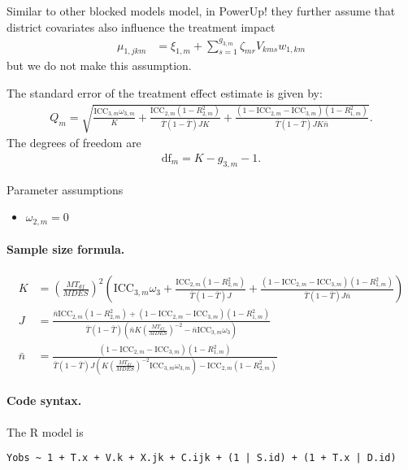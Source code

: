 \documentclass[12pt]{article}
\begin{document}
Similar to other blocked models model, in PowerUp! they further assume that district covariates also influence the treatment impact
\begin{align*}
\mu_{1,jkm} &= \xi_{1,m} + \sum_{s=1}^{g_{3,m}} \zeta_{mr} V_{kms} w_{1,km}
\end{align*}
but we do not make this assumption.

The standard error of the treatment effect estimate is given by:
\begin{align}
Q_m = \sqrt{
\frac{\text{ICC}_{3,m} \omega_{3,m}}{K} +
\frac{\text{ICC}_{2,m}(1 - R^2_{2,m})}{\bar{T}(1 - \bar{T}) J K } +
\frac{(1-\text{ICC}_{2,m} - \text{ICC}_{3,m})(1-R^2_{1,m})}{\bar{T}(1 - \bar{T}) J K\bar{n}} }.\end{align}
The degrees of freedom are
\begin{align}\text{df}_m = K - g_{3,m} - 1.\end{align}

Parameter assumptions
\begin{itemize}
\item $\omega_{2,m} = 0$
\end{itemize}


\paragraph{Sample size formula.} 
\begin{align}
K &= \left(\frac{MT_{df}}{MDES}\right)^2 \left( \text{ICC}_{3,m} \omega_3  +  \frac{\text{ICC}_{2,m} (1-R_{2,m}^2)}{\bar{T}(1 - \bar{T}) J} + \frac{(1-\text{ICC}_{2,m}-\text{ICC}_{3,m})(1-R^2_{1,m})}{\bar{T}(1 - \bar{T}) J \bar{n}} \right)\\
J &=  \frac{\bar{n}\text{ICC}_{2,m} (1-R_{2,m}^2) + (1-\text{ICC}_{2,m}-\text{ICC}_{3,m})(1-R^2_{1,m})}{\bar{T}(1 - \bar{T})\left(\bar{n} K \left(\frac{MT_{df}}{MDES}\right)^{-2} - \bar{n} \text{ICC}_{3,m} \omega_3\right)}\\
\bar{n} &= \frac{(1-\text{ICC}_{2,m}-\text{ICC}_{3,m})(1-R^2_{1,m})}{\bar{T}(1 - \bar{T})J \left(K \left(\frac{MT_{df}}{MDES}\right)^{-2}  \text{ICC}_{3,m}\omega_{3,m}\right) -  \text{ICC}_{2,m} (1-R_{2,m}^2)}
\end{align}

\paragraph{Code syntax.}
The R model is
\begin{verbatim}
Yobs ~ 1 + T.x + V.k + X.jk + C.ijk + (1 | S.id) + (1 + T.x | D.id)
\end{verbatim}
\end{document}

